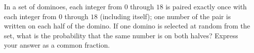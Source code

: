 In a set of dominoes, each integer from $0$ through $18$ is paired exactly once with each integer from $0$ through $18$ (including itself); one number of the pair is written on each half of the domino. If one domino is selected at random from the set, what is the probability that the same number is on both halves? Express your answer as a common fraction.
